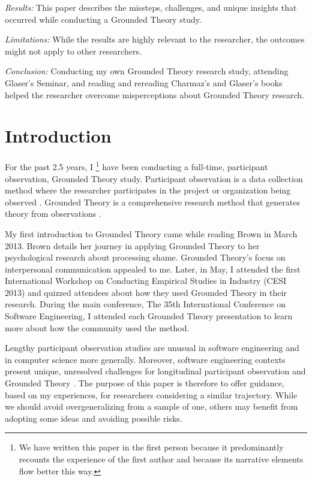 \textit{Results:} This paper describes the missteps, challenges, and unique insights that occurred while conducting a Grounded Theory study.

\textit{Limitations:} While the results are highly relevant to the researcher, the outcomes might not apply to other researchers.

\textit{Conclusion:} Conducting my own Grounded Theory research study, attending Glaser's Seminar, and reading and rereading Charmaz's and Glaser's books helped the researcher overcome misperceptions about Grounded Theory research.
\section{Introduction}
For the past 2.5 years, I \footnote{We have written this paper in the first person because it predominantly recounts the experience of the first author and because its narrative elements flow better this way.} have been conducting a full-time, participant observation, Grounded Theory study. Participant observation is a data collection method where the researcher participates in the project or organization being observed \cite{Trochim2006ResearchMethods}. Grounded Theory is a comprehensive research method that generates theory from observations \cite{GlaserDiscovery}. 

My first introduction to Grounded Theory came while reading Brown \cite{BreneBrownDaringGreatly} in March 2013. Brown details her journey in applying Grounded Theory to her psychological research about processing shame. Grounded Theory's focus on interpersonal communication appealed to me. Later, in May, I attended the first International Workshop on Conducting Empirical Studies in Industry (CESI 2013) and quizzed attendees about how they used Grounded Theory in their research. During the main conference, The 35th International Conference on Software Engineering, I attended each Grounded Theory presentation to learn more about how the community used the method.

Lengthy participant observation studies are unusual in software engineering and in computer science more generally. Moreover, software engineering contexts present unique, unresolved challenges for longitudinal participant observation and Grounded Theory \cite{StolGroundedTheory}. The purpose of this paper is therefore to offer guidance, based on my experiences, for researchers considering a similar trajectory. While we should avoid overgeneralizing from a sample of one, others may benefit from adopting some ideas and avoiding possible risks. 

